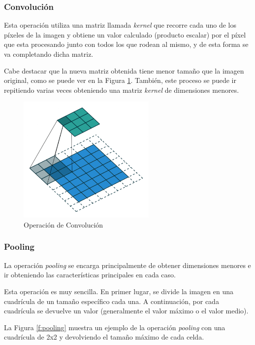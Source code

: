\subsubsection{Convolución}
Esta operación utiliza una matriz llamada \emph{kernel} que recorre cada uno de los píxeles de la imagen y obtiene un valor calculado (producto escalar) por el píxel que esta procesando junto con todos los que rodean al mismo, y de esta forma se va completando dicha matriz.

Cabe destacar que la nueva matriz obtenida tiene menor tamaño que la imagen original, como se puede ver en la Figura \ref{f:convo}. También, este proceso se puede ir repitiendo varias veces obteniendo una matriz \emph{kernel} de dimensiones menores.

\begin{figure}[h]
 \centering
  \includegraphics[width=0.6\textwidth]{img/Convo.png}
 \caption{Operación de Convolución \cite{wiki:convo}}
 \label{f:convo}
\end{figure}

\subsubsection{Pooling}
La operación \emph{pooling} se encarga principalmente de obtener dimensiones menores e ir obteniendo las características principales en cada caso.

Esta operación es muy sencilla. En primer lugar, se divide la imagen en una cuadrícula de un tamaño específico cada una. A continuación, por cada cuadrícula se devuelve un valor (generalmente el valor máximo o el valor medio).

La Figura \ref{f:pooling} muestra un ejemplo de la operación \emph{pooling} con una cuadrícula de 2x2 y devolviendo el tamaño máximo de cada celda.

